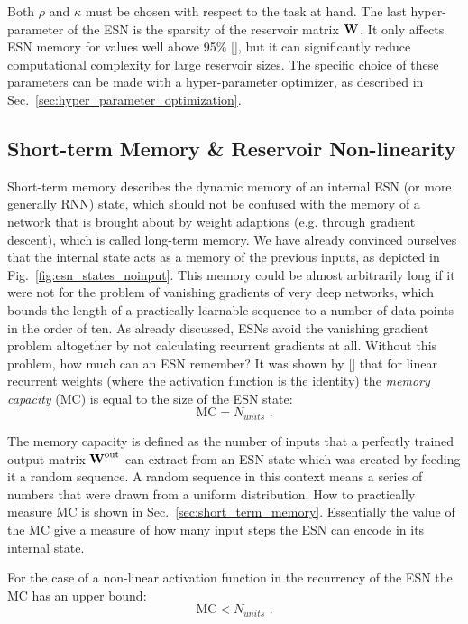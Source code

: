 Both $\rho$ and $\kappa$ must be chosen with respect to the task at hand.  The
last hyper-parameter of the ESN is the sparsity of the reservoir matrix
$\boldsymbol{\textbf{W}}^{\text{}}$. It only affects ESN memory for values well above 95\%
[\cite{farkavs2016}], but it can significantly reduce computational complexity
for large reservoir sizes.  The specific choice of these parameters can be made
with a hyper-parameter optimizer, as described in
Sec.~\ref{sec:hyper_parameter_optimization}.


\subsection{Short-term Memory \& Reservoir Non-linearity}%
\label{sub:short_term_memory}

Short-term memory describes the dynamic memory of an internal ESN (or more
generally RNN) state, which should not be confused with the memory of a network
that is brought about by weight adaptions (e.g. through gradient descent),
which is called long-term memory.  We have already convinced ourselves that the
internal state acts as a memory of the previous inputs, as depicted in
Fig.~\ref{fig:esn_states_noinput}.  This memory could be almost arbitrarily
long if it were not for the problem of vanishing gradients of very deep
networks, which bounds the length of a practically learnable sequence to a
number of data points in the order of ten.  As already discussed, ESNs avoid
the vanishing gradient problem altogether by not calculating recurrent
gradients at all. Without this problem, how much can an ESN remember?  It was
shown by [\cite{jaeger2002}] that for linear recurrent weights (where the
activation function is the identity) the \emph{memory capacity} (MC) is equal
to the size of the ESN state:
\begin{equation}
  \text{MC} = N_{units} \text{ .}
\end{equation}

The memory capacity is defined as the number of inputs that a perfectly trained
output matrix $\boldsymbol{\textbf{W}}^{\text{out}}$ can extract from an ESN state which was created by
feeding it a random sequence.  A random sequence in this context means a series
of numbers that were drawn from a uniform distribution. How to practically measure
MC is shown in Sec.~\ref{sec:short_term_memory}. Essentially the value of the MC
give a measure of how many input steps the ESN can encode in its internal state.

For the case of a non-linear activation function in the recurrency of the ESN
the MC has an upper bound:
\begin{equation}
  \text{MC} < N_{units} \text{ .}
\end{equation}


